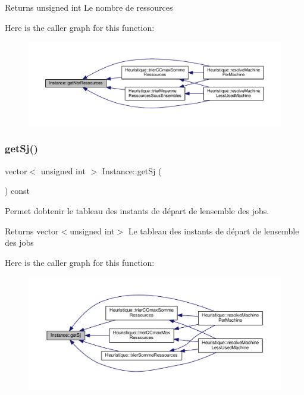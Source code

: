 \begin{DoxyReturn}{Returns}
unsigned int Le nombre de ressources 
\end{DoxyReturn}
Here is the caller graph for this function\+:\nopagebreak
\begin{figure}[H]
\begin{center}
\leavevmode
\includegraphics[width=350pt]{classInstance_a79b49dcc3d590b823e41d8a223ecf25d_icgraph}
\end{center}
\end{figure}
\mbox{\label{classInstance_ab998bc8d9a8b03c8f6279573779217cc}} 
\subsubsection{\texorpdfstring{get\+Sj()}{getSj()}}
{\footnotesize\ttfamily vector$<$ unsigned int $>$ Instance\+::get\+Sj (\begin{DoxyParamCaption}{ }\end{DoxyParamCaption}) const}



Permet d\textquotesingle{}obtenir le tableau des instants de départ de l\textquotesingle{}ensemble des jobs. 

\begin{DoxyReturn}{Returns}
vector$<$unsigned int$>$ Le tableau des instants de départ de l\textquotesingle{}ensemble des jobs 
\end{DoxyReturn}
Here is the caller graph for this function\+:\nopagebreak
\begin{figure}[H]
\begin{center}
\leavevmode
\includegraphics[width=350pt]{classInstance_ab998bc8d9a8b03c8f6279573779217cc_icgraph}
\end{center}
\end{figure}
\mbox{\label{classInstance_a2011ff3253fcb1d2d354c3c34a14a6fb}} 
